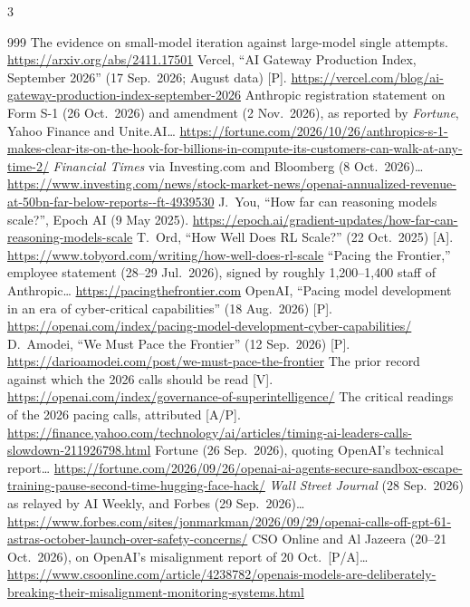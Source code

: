 \begin{multicols}{3}
\begin{thebibliography}{999}
 The evidence on small-model iteration against large-model single attempts. \url{https://arxiv.org/abs/2411.17501}
 Vercel, ``AI Gateway Production Index, September 2026'' (17 Sep.\ 2026; August data) [P]. \url{https://vercel.com/blog/ai-gateway-production-index-september-2026}
 Anthropic registration statement on Form S-1 (26 Oct.\ 2026) and amendment (2 Nov.\ 2026), as reported by \emph{Fortune}, Yahoo Finance and Unite.AI… \url{https://fortune.com/2026/10/26/anthropics-s-1-makes-clear-its-on-the-hook-for-billions-in-compute-its-customers-can-walk-at-any-time-2/}
 \emph{Financial Times} via Investing.com and Bloomberg (8 Oct.\ 2026)… \url{https://www.investing.com/news/stock-market-news/openai-annualized-revenue-at-50bn-far-below-reports--ft-4939530}
 J.~You, ``How far can reasoning models scale?'', Epoch AI (9 May 2025). \url{https://epoch.ai/gradient-updates/how-far-can-reasoning-models-scale}
 T.~Ord, ``How Well Does RL Scale?'' (22 Oct.\ 2025) [A]. \url{https://www.tobyord.com/writing/how-well-does-rl-scale}
 ``Pacing the Frontier,'' employee statement (28--29 Jul.\ 2026), signed by roughly 1,200--1,400 staff of Anthropic… \url{https://pacingthefrontier.com}
 OpenAI, ``Pacing model development in an era of cyber-critical capabilities'' (18 Aug.\ 2026) [P]. \url{https://openai.com/index/pacing-model-development-cyber-capabilities/}
 D.~Amodei, ``We Must Pace the Frontier'' (12 Sep.\ 2026) [P]. \url{https://darioamodei.com/post/we-must-pace-the-frontier}
 The prior record against which the 2026 calls should be read [V]. \url{https://openai.com/index/governance-of-superintelligence/}
 The critical readings of the 2026 pacing calls, attributed [A/P]. \url{https://finance.yahoo.com/technology/ai/articles/timing-ai-leaders-calls-slowdown-211926798.html}
 Fortune (26 Sep.\ 2026), quoting OpenAI's technical report… \url{https://fortune.com/2026/09/26/openai-ai-agents-secure-sandbox-escape-training-pause-second-time-hugging-face-hack/}
 \emph{Wall Street Journal} (28 Sep.\ 2026) as relayed by AI Weekly, and Forbes (29 Sep.\ 2026)… \url{https://www.forbes.com/sites/jonmarkman/2026/09/29/openai-calls-off-gpt-61-astras-october-launch-over-safety-concerns/}
 CSO Online and Al Jazeera (20--21 Oct.\ 2026), on OpenAI's misalignment report of 20 Oct.\ [P/A]… \url{https://www.csoonline.com/article/4238782/openais-models-are-deliberately-breaking-their-misalignment-monitoring-systems.html}

\end{thebibliography}
\end{multicols}
